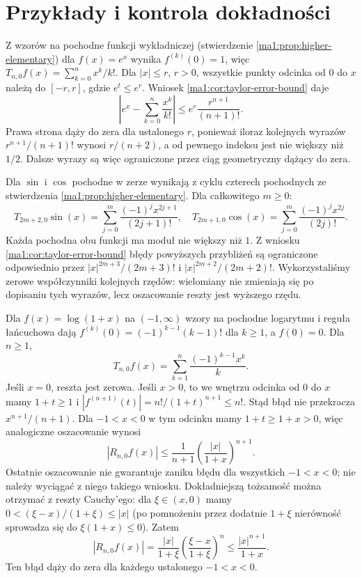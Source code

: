 \section{Przykłady i kontrola dokładności}
\begin{przyklad}
\label{ma1:ex:taylor-exp}
Z wzorów na pochodne funkcji wykładniczej (stwierdzenie \ref{ma1:prop:higher-elementary}) dla $f(x)=e^x$ wynika $f^{(k)}(0)=1$, więc $T_{n,0}f(x)=\sum_{k=0}^n x^k/k!$. Dla $|x|\le r$, $r>0$, wszystkie punkty odcinka od $0$ do $x$ należą do $[-r,r]$, gdzie $e^t\le e^r$. Wniosek \ref{ma1:cor:taylor-error-bound} daje
\[
 \left|e^x-\sum_{k=0}^n\frac{x^k}{k!}\right|
 \le e^r\frac{r^{n+1}}{(n+1)!}.
\]
Prawa strona dąży do zera dla ustalonego $r$, ponieważ iloraz kolejnych wyrazów $r^{n+1}/(n+1)!$ wynosi $r/(n+2)$, a od pewnego indeksu jest nie większy niż $1/2$. Dalsze wyrazy są więc ograniczone przez ciąg geometryczny dążący do zera.
\end{przyklad}
\begin{przyklad}
\label{ma1:ex:taylor-trig}
Dla $\sin$ i $\cos$ pochodne w zerze wynikają z cyklu czterech pochodnych ze stwierdzenia \ref{ma1:prop:higher-elementary}. Dla całkowitego $m\ge0$:
\[
 T_{2m+2,0}\sin(x)=\sum_{j=0}^{m}\frac{(-1)^j x^{2j+1}}{(2j+1)!},
 \quad
 T_{2m+1,0}\cos(x)=\sum_{j=0}^{m}\frac{(-1)^j x^{2j}}{(2j)!}.
\]
Każda pochodna obu funkcji ma moduł nie większy niż $1$. Z wniosku \ref{ma1:cor:taylor-error-bound} błędy powyższych przybliżeń są ograniczone odpowiednio przez $|x|^{2m+3}/(2m+3)!$ i $|x|^{2m+2}/(2m+2)!$. Wykorzystaliśmy zerowe współczynniki kolejnych rzędów: wielomiany nie zmieniają się po dopisaniu tych wyrazów, lecz oszacowanie reszty jest wyższego rzędu.
\end{przyklad}
\begin{przyklad}
\label{ma1:ex:taylor-log}
Dla $f(x)=\log(1+x)$ na $(-1,\infty)$ wzory na pochodne logarytmu i reguła łańcuchowa dają $f^{(k)}(0)=(-1)^{k-1}(k-1)!$ dla $k\ge1$, a $f(0)=0$. Dla $n\ge1$,
\[
 T_{n,0}f(x)=\sum_{k=1}^n\frac{(-1)^{k-1}x^k}{k}.
\]
Jeśli $x=0$, reszta jest zerowa. Jeśli $x>0$, to we wnętrzu odcinka od $0$ do $x$ mamy $1+t\ge1$ i $|f^{(n+1)}(t)|=n!/(1+t)^{n+1}\le n!$. Stąd błąd nie przekracza $x^{n+1}/(n+1)$. Dla $-1<x<0$ w tym odcinku mamy $1+t\ge1+x>0$, więc analogiczne oszacowanie wynosi
\[
 |R_{n,0}f(x)|\le\frac{1}{n+1}
                 \left(\frac{|x|}{1+x}\right)^{n+1}.
\]
Ostatnie oszacowanie nie gwarantuje zaniku błędu dla wszystkich $-1<x<0$; nie należy wyciągać z niego takiego wniosku. Dokładniejszą tożsamość można otrzymać z reszty Cauchy'ego: dla $\xi\in(x,0)$ mamy $0<(\xi-x)/(1+\xi)\le |x|$ (po pomnożeniu przez dodatnie $1+\xi$ nierówność sprowadza się do $\xi(1+x)\le0$). Zatem
\[
 |R_{n,0}f(x)|
 =\frac{|x|}{1+\xi}\left(\frac{\xi-x}{1+\xi}\right)^n
 \le \frac{|x|^{n+1}}{1+x}.
\]
Ten błąd dąży do zera dla każdego ustalonego $-1<x<0$.
\end{przyklad}

